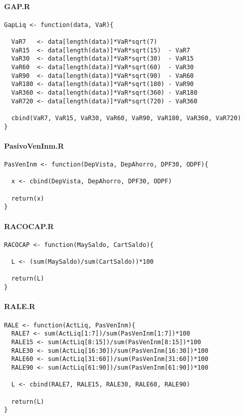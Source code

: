 \documentclass[]{article}
\begin{document}
\hypertarget{gap.r}{%
\paragraph{GAP.R}\label{gap.r}}

\begin{verbatim}
GapLiq <- function(data, VaR){
  
  VaR7   <- data[length(data)]*VaR*sqrt(7)
  VaR15  <- data[length(data)]*VaR*sqrt(15)  - VaR7
  VaR30  <- data[length(data)]*VaR*sqrt(30)  - VaR15
  VaR60  <- data[length(data)]*VaR*sqrt(60)  - VaR30
  VaR90  <- data[length(data)]*VaR*sqrt(90)  - VaR60
  VaR180 <- data[length(data)]*VaR*sqrt(180) - VaR90
  VaR360 <- data[length(data)]*VaR*sqrt(360) - VaR180
  VaR720 <- data[length(data)]*VaR*sqrt(720) - VaR360
  
  cbind(VaR7, VaR15, VaR30, VaR60, VaR90, VaR180, VaR360, VaR720)
}
\end{verbatim}

\hypertarget{pasivoveninm.r}{%
\paragraph{PasivoVenInm.R}\label{pasivoveninm.r}}

\begin{verbatim}
PasVenInm <- function(DepVista, DepAhorro, DPF30, ODPF){
  
  x <- cbind(DepVista, DepAhorro, DPF30, ODPF)
  
  return(x)
}
\end{verbatim}

\hypertarget{racocap.r}{%
\paragraph{RACOCAP.R}\label{racocap.r}}

\begin{verbatim}
RACOCAP <- function(MaySaldo, CartSaldo){
  
  L <- (sum(MaySaldo)/sum(CartSaldo))*100
  
  return(L)
}
\end{verbatim}

\hypertarget{rale.r}{%
\paragraph{RALE.R}\label{rale.r}}

\begin{verbatim}
RALE <- function(ActLiq, PasVenInm){
  RALE7 <- sum(ActLiq[1:7])/sum(PasVenInm[1:7])*100
  RALE15 <- sum(ActLiq[8:15])/sum(PasVenInm[8:15])*100
  RALE30 <- sum(ActLiq[16:30])/sum(PasVenInm[16:30])*100
  RALE60 <- sum(ActLiq[31:60])/sum(PasVenInm[31:60])*100
  RALE90 <- sum(ActLiq[61:90])/sum(PasVenInm[61:90])*100
  
  L <- cbind(RALE7, RALE15, RALE30, RALE60, RALE90)
  
  return(L)
}
\end{verbatim}
\end{document}
